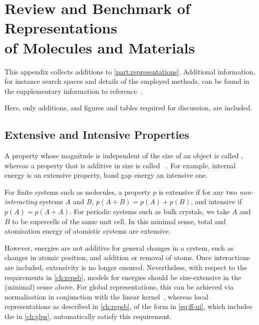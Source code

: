 
\chapter[Review and Benchmark of Representations\\ of Molecules and Materials]{Review and Benchmark of Representations\\ of Molecules and Materials}
\label{ch:si-reps}

This appendix collects additions to \cref{part:representations}. Additional information, for instance \hp search spaces and details of the employed methods, can be found in the supplementary information to reference~\cite{lgr2022q}.

Here, only additions, and figures and tables required for discussion, are included.

\section{Extensive and Intensive Properties}
\label{sec:si-reps-extensive}

A property whose magnitude is independent of the size of an object is called , whereas a property that is additive in size is called ~\cite{t1917p,hatsopoulos1965}.
For example, internal energy is an extensive property, band gap energy an intensive one.

For finite systems such as molecules, a property $p$ is extensive if for any two \emph{non-interacting} systems $A$ and $B$, $p(A+B) = p(A) + p(B)$, \cite{jsrm2020q}
and intensive if $p(A) = p(A+A)$.
For periodic systems such as bulk crystals, we take $A$ and $B$ to be supercells of the same unit cell.
In this minimal sense, total and atomisation energy of atomistic systems are extensive.

However, energies are not additive for general changes in a system, such as changes in atomic position, and addition or removal of atoms. Once interactions are included, extensivity is no longer ensured. Nevertheless, with respect to the requirements in \cref{ch:repsb}, \ml models for energies should be size-extensive in the (minimal) sense above.
%
For global representations, this can be achieved via normalisation in conjunction with the linear kernel~\cite{jsrm2020q}, whereas local representations as described in \cref{ch:repsb}, \ffs of the form in \cref{eq:ff-ui}, which includes the \glps in \cref{ch:glps}, automatically satisfy this requirement.

